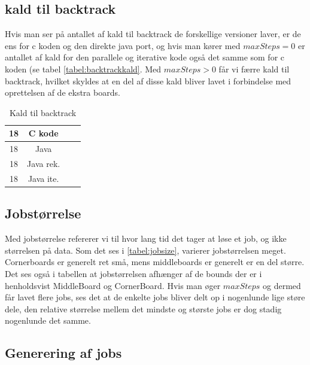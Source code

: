 \subsection{kald til backtrack}

Hvis man ser på antallet af kald til backtrack de forskellige versioner laver,
er de ens for c koden og den direkte java port, og hvis man kører med
$maxSteps=0$ er antallet af kald for den parallele og iterative kode også det
samme som for c koden (se tabel \ref{tabel:backtrackkald}. Med $maxSteps>0$ får
vi færre kald til backtrack, hvilket skyldes at en del af disse kald bliver
lavet i forbindelse med oprettelsen af de ekstra boards. 

\begin{table}
\begin{center}
\begin{tabular}{|c|c|c|c|}
\hline 18 & C kode        &             &             \\
\hline 18 & Java          &             &             \\
\hline 18 & Java rek. &             &             \\
\hline 18 & Java ite. &             &             \\
\hline
\end{tabular}
\caption{Kald til backtrack}
\label{table:backtrackkald}
\end{center}
\end{table}

\subsection{Jobstørrelse}

Med jobstørrelse refererer vi til hvor lang tid det tager at løse et job, og
ikke størrelsen på data. 
Som det ses i \ref{tabel:jobsize}, varierer jobstørrelsen
meget. Cornerboards er generelt ret små, mens middleboards er generelt er en del
større. Det ses også i tabellen at jobstørrelsen afhænger af de bounds der er i
henholdsvist MiddleBoard og CornerBoard. Hvis man øger $maxSteps$ og dermed får
lavet flere jobs, ses det at de enkelte jobs bliver delt op i nogenlunde lige
støre dele, den relative størrelse mellem det mindste og største jobs er dog
stadig nogenlunde det samme. 

\subsection{Generering af jobs}

